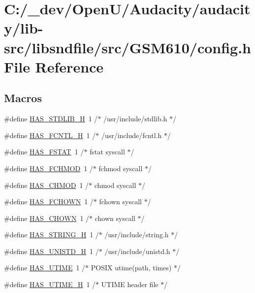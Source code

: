 \hypertarget{lib-src_2libsndfile_2src_2_g_s_m610_2config_8h}{}\section{C\+:/\+\_\+dev/\+Open\+U/\+Audacity/audacity/lib-\/src/libsndfile/src/\+G\+S\+M610/config.h File Reference}
\label{lib-src_2libsndfile_2src_2_g_s_m610_2config_8h}
\subsection*{Macros}
\begin{DoxyCompactItemize}
\item 
\#define \hyperlink{lib-src_2libsndfile_2src_2_g_s_m610_2config_8h_a1be90a64eaebf231122bb0088552674b}{H\+A\+S\+\_\+\+S\+T\+D\+L\+I\+B\+\_\+H}~1		/$\ast$ /usr/include/stdlib.\+h	$\ast$/
\item 
\#define \hyperlink{lib-src_2libsndfile_2src_2_g_s_m610_2config_8h_a99339dbbd03ba6deaadc65918d649d76}{H\+A\+S\+\_\+\+F\+C\+N\+T\+L\+\_\+H}~1		/$\ast$ /usr/include/fcntl.\+h		$\ast$/
\item 
\#define \hyperlink{lib-src_2libsndfile_2src_2_g_s_m610_2config_8h_ac00fdd26c1055bd8bab28bef3133cf1a}{H\+A\+S\+\_\+\+F\+S\+T\+AT}~1		/$\ast$ fstat syscall		$\ast$/
\item 
\#define \hyperlink{lib-src_2libsndfile_2src_2_g_s_m610_2config_8h_a0e5226d53841e0efc4c177acda21d71f}{H\+A\+S\+\_\+\+F\+C\+H\+M\+OD}~1		/$\ast$ fchmod syscall		$\ast$/
\item 
\#define \hyperlink{lib-src_2libsndfile_2src_2_g_s_m610_2config_8h_a674dc96e2355cea32a4c7ef1c1ae9ad0}{H\+A\+S\+\_\+\+C\+H\+M\+OD}~1		/$\ast$ chmod syscall		$\ast$/
\item 
\#define \hyperlink{lib-src_2libsndfile_2src_2_g_s_m610_2config_8h_a0eb2775f2b2ee01c21abe9293bf21e88}{H\+A\+S\+\_\+\+F\+C\+H\+O\+WN}~1		/$\ast$ fchown syscall		$\ast$/
\item 
\#define \hyperlink{lib-src_2libsndfile_2src_2_g_s_m610_2config_8h_aa406048c7c2ce8a58dc6406f8f29dbb0}{H\+A\+S\+\_\+\+C\+H\+O\+WN}~1		/$\ast$ chown syscall		$\ast$/
\item 
\#define \hyperlink{lib-src_2libsndfile_2src_2_g_s_m610_2config_8h_aca5b82d856c65134601d4bf8b0aaefe6}{H\+A\+S\+\_\+\+S\+T\+R\+I\+N\+G\+\_\+H}~1		/$\ast$ /usr/include/string.\+h 	$\ast$/
\item 
\#define \hyperlink{lib-src_2libsndfile_2src_2_g_s_m610_2config_8h_a912c675fabd05445f7adc0a37e23a531}{H\+A\+S\+\_\+\+U\+N\+I\+S\+T\+D\+\_\+H}~1		/$\ast$ /usr/include/unistd.\+h	$\ast$/
\item 
\#define \hyperlink{lib-src_2libsndfile_2src_2_g_s_m610_2config_8h_ab5d5f167b871383fdb268658c8a45e20}{H\+A\+S\+\_\+\+U\+T\+I\+ME}~1		/$\ast$ P\+O\+S\+IX utime(path, times)	$\ast$/
\item 
\#define \hyperlink{lib-src_2libsndfile_2src_2_g_s_m610_2config_8h_a947143d0bf42a74279e04cf044add3b0}{H\+A\+S\+\_\+\+U\+T\+I\+M\+E\+\_\+H}~1		/$\ast$ U\+T\+I\+ME header file		$\ast$/
\end{DoxyCompactItemize}


